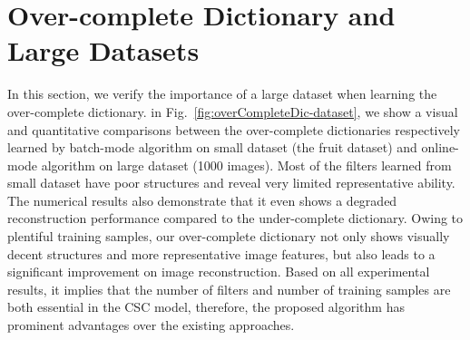 \section{Over-complete Dictionary and Large Datasets}
In this section, we verify the importance of a large dataset when learning the over-complete dictionary. in Fig.~\ref{fig:overCompleteDic-dataset}, we show a visual and quantitative comparisons between the over-complete dictionaries respectively learned by batch-mode algorithm on small dataset (the fruit dataset) and online-mode algorithm on large dataset (1000 images). Most of the filters learned from small dataset have poor structures and reveal very limited representative ability. The numerical results also demonstrate that it even shows a degraded reconstruction performance compared to the under-complete dictionary. Owing to plentiful training samples, our over-complete dictionary not only shows visually decent structures and more representative image features, but also leads to a significant improvement on image reconstruction. Based on all experimental results, it implies that the number of filters and number of training samples are both essential in the CSC model, therefore, the proposed algorithm has prominent advantages over the existing approaches.

